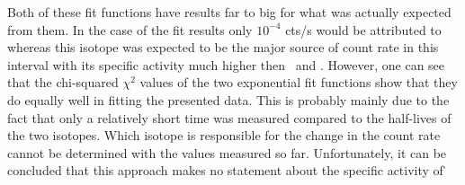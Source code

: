 \documentclass[encoding=utf8,british]{tumphthesis}
\begin{document}
Both of these fit functions have results far to big for what was actually expected from them.
In the case of the  fit results only $10^{-4}$ cts/s would be attributed to  whereas this isotope was expected to be the major source of count rate in this interval with its specific activity much higher then \Kr\ and .
However, one can see that the chi-squared $\chi^2$ values of the two exponential fit functions show that they do equally well in fitting the presented data.
This is probably mainly due to the fact that only a relatively short time was measured compared to the half-lives of the two isotopes.
Which isotope is responsible for the change in the count rate cannot be determined with the values measured so far.
Unfortunately, it can be concluded that this approach makes no statement about the specific activity of \Kr\.
\end{document}
